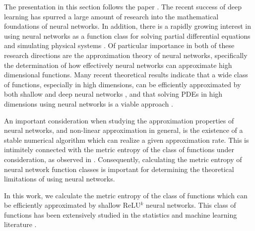 
The presentation in this section follows the paper \cite{siegel2021optimal}. 
The recent success of deep learning \cite{lecun2015deep} has spurred a large amount of research into the mathematical foundations of neural networks. In addition, there is a rapidly growing interest in using neural networks as a function class for solving partial differential equations \cite{han2018solving,CiCP-28-1707} and simulating physical systems \cite{raissi2018hidden}. Of particular importance in both of these research directions are the approximation theory of neural networks, specifically the determination of how effectively neural networks can approximate high dimensional functions. Many recent theoretical results indicate that a wide class of functions, especially in high dimensions, can be efficiently approximated by both shallow \cite{wojtowytsch2020representation,ma2019priori,siegel2020approximation} and deep neural networks \cite{yarotsky2017error,lu2020deep,opschoor2020deep,daubechies2019nonlinear,devore2020neural,li2019better}, and that solving PDEs in high dimensions using neural networks is a viable approach \cite{lu2021priori,li2020multipole,luo2020two}.

An important consideration when studying the approximation properties of neural networks, and non-linear approximation in general, is the existence of a stable numerical algorithm which can realize a given approximation rate. This is intimitely connected with the metric entropy of the class of functions under consideration, as observed in \cite{cohen2020optimal}. Consequently, calculating the metric entropy of neural network function classes is important for determining the theoretical limitations of using neural networks.

In this work, we calculate the metric entropy of the class of functions which can be efficiently approximated by shallow ReLU$^k$ neural networks. This class of functions has been extensively studied in the statistics and machine learning literature \cite{barron1993universal,jones1992simple,klusowski2018approximation}. 

